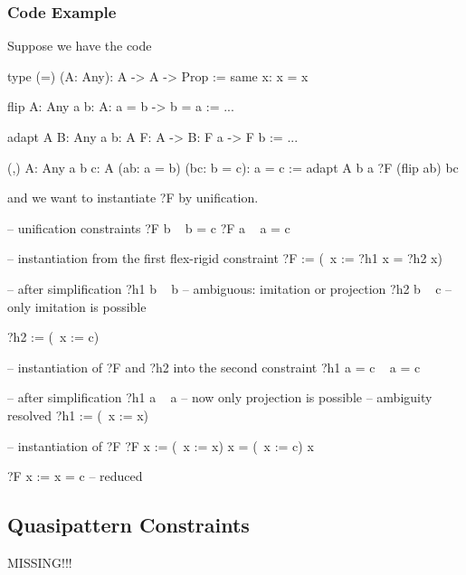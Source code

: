\subsubsection{Code Example}

Suppose we have the code
\begin{alba}
    type (=) (A: Any): A -> A -> Prop :=
        same {x}: x = x

    flip {A: Any} {a b: A}: a = b -> b = a :=
        ...

    adapt {A B: Any} {a b: A} {F: A -> B}: F a -> F b :=
        ...

    (,) {A: Any} {a b c: A} (ab: a = b) (bc: b = c): a = c :=
        adapt {A} {b} {a} {?F} (flip ab) bc
\end{alba}
%
and we want to instantiate ?F by unification.

\begin{alba}
    -- unification constraints
    ?F b   ~   b = c
    ?F a   ~   a = c

    -- instantiation from the first flex-rigid constraint
    ?F := (\ x := ?h1 x = ?h2 x)

    -- after simplification
    ?h1 b  ~  b             -- ambiguous: imitation or projection
    ?h2 b  ~  c             -- only imitation is possible

    ?h2 := (\ x := c)

    -- instantiation of ?F and ?h2 into the second constraint
    ?h1 a = c    ~    a = c

    -- after simplification
    ?h1 a  ~  a             -- now only projection is possible
                            -- ambiguity resolved
    ?h1 := (\ x := x)

    -- instantiation of ?F
    ?F x := (\ x := x) x = (\ x := c) x

    ?F x := x = c   -- reduced
\end{alba}









\subsection{Quasipattern Constraints}


MISSING!!!









